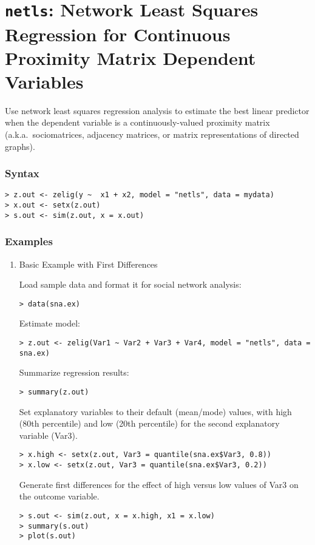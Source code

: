 \section{{\tt netls}: Network Least Squares Regression for Continuous
Proximity Matrix Dependent Variables}\label{netls}

Use network least squares regression analysis to estimate the
best linear predictor when the dependent variable is a
continuously-valued proximity matrix (a.k.a.\ sociomatrices, adjacency
matrices, or matrix representations of directed graphs). 

\subsubsection{Syntax}
\begin{verbatim}
> z.out <- zelig(y ~  x1 + x2, model = "netls", data = mydata)
> x.out <- setx(z.out)
> s.out <- sim(z.out, x = x.out)
\end{verbatim}

\subsubsection{Examples}
\begin{enumerate}
\item Basic Example with First Differences 

Load sample data and format it for social network analysis:
\begin{verbatim}
> data(sna.ex)
\end{verbatim}
Estimate model:
\begin{verbatim}
> z.out <- zelig(Var1 ~ Var2 + Var3 + Var4, model = "netls", data = sna.ex)
\end{verbatim}

Summarize regression results:
\begin{verbatim}
> summary(z.out)
\end{verbatim}

Set explanatory variables to their default (mean/mode) values, with
high (80th percentile) and low (20th percentile) for the second
explanatory variable (Var3).
\begin{verbatim}
> x.high <- setx(z.out, Var3 = quantile(sna.ex$Var3, 0.8))
> x.low <- setx(z.out, Var3 = quantile(sna.ex$Var3, 0.2))
\end{verbatim}
Generate first differences for the effect of high versus low values of
Var3 on the outcome variable.
\begin{verbatim}
> s.out <- sim(z.out, x = x.high, x1 = x.low)
> summary(s.out)
> plot(s.out)
\end{verbatim}
\end{enumerate}

